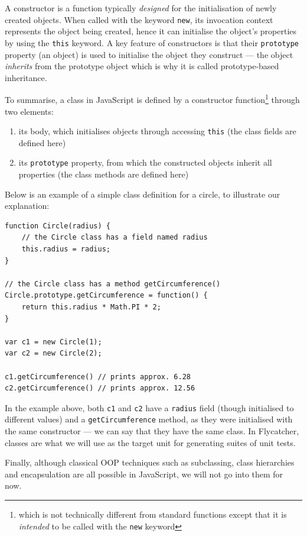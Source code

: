\documentclass[a4paper,11pt,titlepage]{report}
\begin{document}
A constructor is a function typically \emph{designed} for the initialisation of newly created objects. When called with the keyword \texttt{new}, its invocation context represents the object being created, hence it can initialise the object's properties by using the \texttt{this} keyword. A key feature of constructors is that their \texttt{prototype} property (an object) is used to initialise the object they construct --- the object \emph{inherits} from the prototype object which is why it is called prototype-based inheritance.

To summarise, a class in JavaScript is defined by a constructor function\footnote{which is not technically different from standard functions except that it is \emph{intended} to be called with the \texttt{new} keyword} through two elements:

\begin{enumerate}
   \item its body, which initialises objects through accessing \texttt{this} (the class fields are defined here)
   \item its \texttt{prototype} property, from which the constructed objects inherit all properties (the class methods are defined here)
\end{enumerate}

Below is an example of a simple class definition for a circle, to illustrate our explanation:

\begin{verbatim}
function Circle(radius) {
    // the Circle class has a field named radius
    this.radius = radius;
}

// the Circle class has a method getCircumference()
Circle.prototype.getCircumference = function() {
    return this.radius * Math.PI * 2;
}

var c1 = new Circle(1);
var c2 = new Circle(2);

c1.getCircumference() // prints approx. 6.28
c2.getCircumference() // prints approx. 12.56

\end{verbatim}

In the example above, both \texttt{c1} and \texttt{c2} have a \texttt{radius} field (though initialised to different values) and a \texttt{getCircumference} method, as they were initialised with the same constructor --- we can say that they have the same class. In \textsf{Flycatcher}, classes are what we will use as the target unit for generating suites of unit tests.

Finally, although classical OOP techniques such as subclassing, class hierarchies and encapsulation are all possible in JavaScript, we will not go into them for now.
\end{document}
